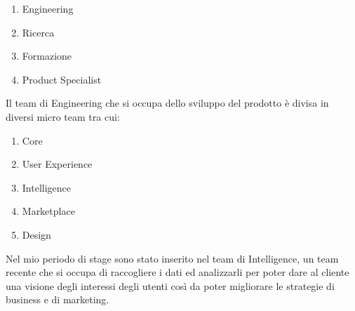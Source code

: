 \documentclass[a4paper, 12pt, twoside, openright]{book}
\begin{document}
\begin{enumerate}
\item Engineering
\item Ricerca
\item Formazione
\item Product Specialist
\end{enumerate}
Il team di Engineering che si occupa dello sviluppo del prodotto è divisa in diversi micro team tra cui:
\begin{enumerate}
\item Core
\item User Experience
\item Intelligence
\item Marketplace
\item Design
\end{enumerate}
Nel mio periodo di stage sono stato inserito nel team di Intelligence, un team recente che si occupa di raccogliere i dati ed analizzarli per poter dare al cliente una visione degli interessi degli utenti così da poter migliorare le strategie di business e di marketing.

\newpage{}
\end{document}
